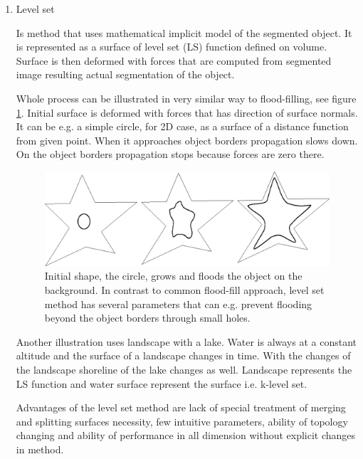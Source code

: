 \begin{enumerate}
  \item Level set

Is method that uses mathematical implicit model of the segmented object.
It is represented as a surface of level set (LS) function defined on volume.
Surface is then deformed with forces that are computed from segmented image resulting actual segmentation of the object.

Whole process can be illustrated in very similar way to flood-filling, see figure \ref{fg:flooding}.
Initial surface is deformed with forces that has direction of surface normals.
It can be e.g. a simple circle, for 2D case, as a surface of a distance function from given point.
When it approaches object borders propagation slows down.
On the object borders propagation stops because forces are zero there.

\begin{figure}
    \centering
    \includegraphics[width=12cm]{data/flooding}
    \caption[Flooding an object]{Initial shape, the circle, grows and floods the object on the background. In contrast to common flood-fill approach, level set method has several parameters that can e.g. prevent flooding beyond the object borders through small holes.}
    \label{fg:flooding}
\end{figure}

\par
Another illustration uses landscape with a lake.
Water is always at a constant altitude and the surface of a landscape changes in time.
With the changes of the landscape shoreline of the lake changes as well.
Landscape represents the LS function and water surface represent the surface i.e. k-level set.

\par
Advantages of the level set method are lack of special treatment of merging and splitting surfaces necessity, few intuitive parameters, ability of topology changing and ability of performance in all dimension without explicit changes in method.

\end{enumerate}

